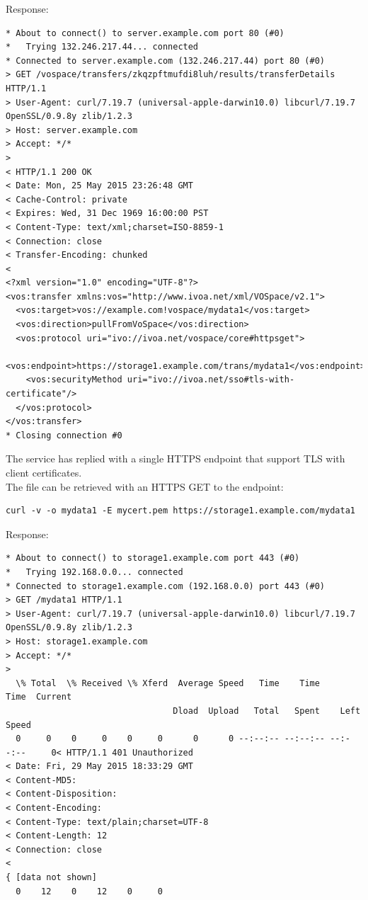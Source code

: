 \documentclass[11pt,a4paper]{ivoa}
\begin{document}
Response:
\begin{lstlisting}
* About to connect() to server.example.com port 80 (#0)
*   Trying 132.246.217.44... connected
* Connected to server.example.com (132.246.217.44) port 80 (#0)
> GET /vospace/transfers/zkqzpftmufdi8luh/results/transferDetails HTTP/1.1
> User-Agent: curl/7.19.7 (universal-apple-darwin10.0) libcurl/7.19.7 OpenSSL/0.9.8y zlib/1.2.3
> Host: server.example.com
> Accept: */*
>
< HTTP/1.1 200 OK
< Date: Mon, 25 May 2015 23:26:48 GMT
< Cache-Control: private
< Expires: Wed, 31 Dec 1969 16:00:00 PST
< Content-Type: text/xml;charset=ISO-8859-1
< Connection: close
< Transfer-Encoding: chunked
<
<?xml version="1.0" encoding="UTF-8"?>
<vos:transfer xmlns:vos="http://www.ivoa.net/xml/VOSpace/v2.1">
  <vos:target>vos://example.com!vospace/mydata1</vos:target>
  <vos:direction>pullFromVoSpace</vos:direction>
  <vos:protocol uri="ivo://ivoa.net/vospace/core#httpsget">
    <vos:endpoint>https://storage1.example.com/trans/mydata1</vos:endpoint>
    <vos:securityMethod uri="ivo://ivoa.net/sso#tls-with-certificate"/>
  </vos:protocol>
</vos:transfer>
* Closing connection #0
\end{lstlisting}
The service has replied with a single HTTPS endpoint that support TLS with client certificates.\\
The file can be retrieved with an HTTPS GET to the endpoint:
\begin{lstlisting}
curl -v -o mydata1 -E mycert.pem https://storage1.example.com/mydata1
\end{lstlisting}
Response:
\begin{lstlisting}
* About to connect() to storage1.example.com port 443 (#0)
*   Trying 192.168.0.0... connected
* Connected to storage1.example.com (192.168.0.0) port 443 (#0)
> GET /mydata1 HTTP/1.1
> User-Agent: curl/7.19.7 (universal-apple-darwin10.0) libcurl/7.19.7 OpenSSL/0.9.8y zlib/1.2.3
> Host: storage1.example.com
> Accept: */*
>
  \% Total  \% Received \% Xferd  Average Speed   Time    Time     Time  Current
                                 Dload  Upload   Total   Spent    Left  Speed
  0     0    0     0    0     0      0      0 --:--:-- --:--:-- --:--:--     0< HTTP/1.1 401 Unauthorized
< Date: Fri, 29 May 2015 18:33:29 GMT
< Content-MD5:
< Content-Disposition:
< Content-Encoding:
< Content-Type: text/plain;charset=UTF-8
< Content-Length: 12
< Connection: close
<
{ [data not shown]
  0    12    0    12    0     0   
\end{lstlisting}
\end{document}
